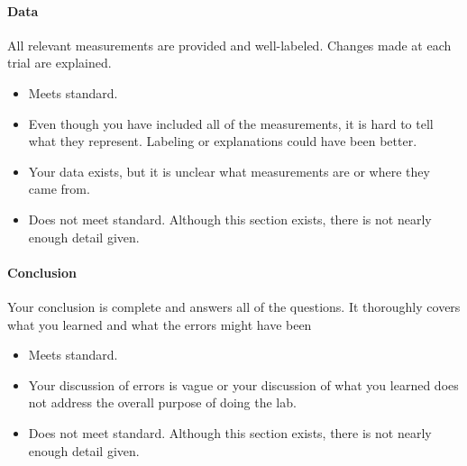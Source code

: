 \documentclass[10pt]{exam}
\begin{document}
\vspace{-0.25em}

\paragraph{Data} All relevant measurements are provided and well-labeled.  Changes made at each trial are explained.	
\begin{itemize}
  \item[\bf 10:] Meets standard.	
  \item[\bf 8:] Even though you have included all of the measurements, it is hard to tell what they represent. Labeling or explanations could have been better. 
  \item[\bf 6:] Your data exists, but it is unclear what measurements are or where they came from.
  \item[\bf 4:] Does not meet standard.  Although this section exists, there is not nearly enough detail given.
\end{itemize}

\vspace{-0.25em}

\paragraph{Conclusion} Your conclusion is complete and answers all of the questions.  It thoroughly covers what you learned and what the errors might have been	
\begin{itemize}
  \item[\bf 5:] Meets standard.	
  \item[\bf 3:] Your discussion of errors is vague or your discussion of what you learned does not address the overall purpose of doing the lab.
  \item[\bf 2:]Does not meet standard. Although this section exists, there is not nearly enough detail given.
\end{itemize}
\end{document}
